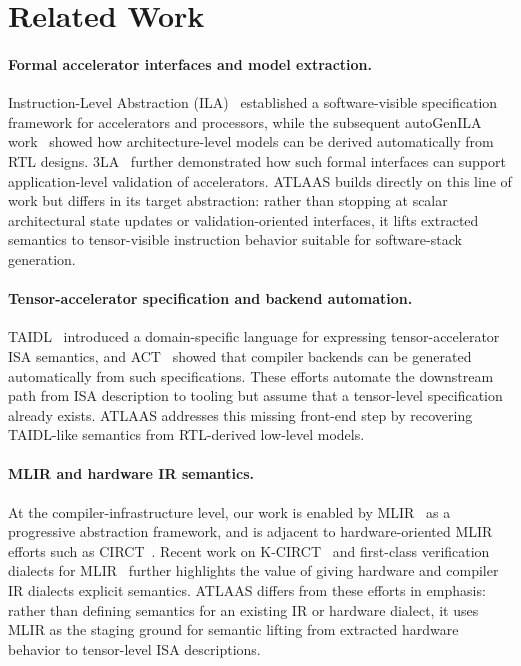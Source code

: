 \section{Related Work}
\label{sec:related}

\paragraph{Formal accelerator interfaces and model extraction.}
Instruction-Level Abstraction (ILA)~\cite{ila} established a software-visible specification framework for accelerators and processors, while the subsequent autoGenILA work~\cite{autogenilaiccad, autogeniladate} showed how architecture-level models can be derived automatically from RTL designs.
3LA~\cite{3la} further demonstrated how such formal interfaces can support application-level validation of accelerators.
ATLAAS builds directly on this line of work but differs in its target abstraction: rather than stopping at scalar architectural state updates or validation-oriented interfaces, it lifts extracted semantics to tensor-visible instruction behavior suitable for software-stack generation.

\paragraph{Tensor-accelerator specification and backend automation.}
TAIDL~\cite{taidl-micro2025} introduced a domain-specific language for expressing tensor-accelerator ISA semantics, and ACT~\cite{act-arxiv} showed that compiler backends can be generated automatically from such specifications.
These efforts automate the downstream path from ISA description to tooling but assume that a tensor-level specification already exists.
ATLAAS addresses this missing front-end step by recovering TAIDL-like semantics from RTL-derived low-level models.

\paragraph{MLIR and hardware IR semantics.}
At the compiler-infrastructure level, our work is enabled by MLIR~\cite{mlir-cgo2021} as a progressive abstraction framework, and is adjacent to hardware-oriented MLIR efforts such as CIRCT~\cite{circt}.
Recent work on K-CIRCT~\cite{kcirct} and first-class verification dialects for MLIR~\cite{fehr2025verification} further highlights the value of giving hardware and compiler IR dialects explicit semantics.
ATLAAS differs from these efforts in emphasis: rather than defining semantics for an existing IR or hardware dialect, it uses MLIR as the staging ground for semantic lifting from extracted hardware behavior to tensor-level ISA descriptions.

